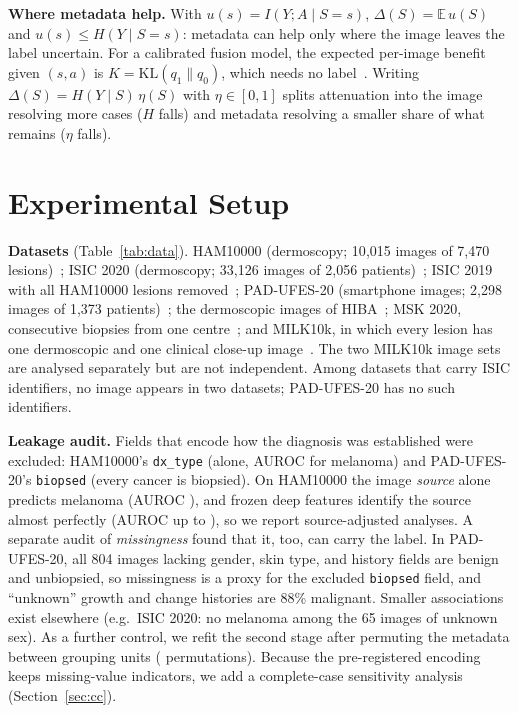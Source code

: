 \documentclass[conference]{IEEEtran}
\begin{document}
\textbf{Where metadata help.} With $u(s)=I(Y;A\mid S=s)$, $\Delta(S)=\mathbb{E}\,u(S)$ and $u(s)\le H(Y\mid S=s)$: metadata can help only where the image leaves the label uncertain. For a calibrated fusion model, the expected per-image benefit given $(s,a)$ is $K=\mathrm{KL}(q_1\|q_0)$, which needs no label~\cite{gadgil2024cmi}. Writing $\Delta(S)=H(Y\mid S)\,\eta(S)$ with $\eta\in[0,1]$ splits attenuation into the image resolving more cases ($H$ falls) and metadata resolving a smaller share of what remains ($\eta$ falls).

\section{Experimental Setup}\label{sec:setup}
\textbf{Datasets} (Table~\ref{tab:data}). HAM10000 (dermoscopy; 10{,}015 images of 7{,}470 lesions)~\cite{tschandl2018ham}; ISIC 2020 (dermoscopy; 33{,}126 images of 2{,}056 patients)~\cite{rotemberg2021isic}; ISIC 2019 with all HAM10000 lesions removed~\cite{combalia2019bcn}; PAD-UFES-20 (smartphone images; 2{,}298 images of 1{,}373 patients)~\cite{pacheco2020pad}; the dermoscopic images of HIBA~\cite{riccilara2023hiba}; MSK 2020, consecutive biopsies from one centre~\cite{msk2020collection}; and MILK10k, in which every lesion has one dermoscopic and one clinical close-up image~\cite{tschandl2026milk}. The two MILK10k image sets are analysed separately but are not independent. Among datasets that carry ISIC identifiers, no image appears in two datasets; PAD-UFES-20 has no such identifiers.

\textbf{Leakage audit.} Fields that encode how the diagnosis was established were excluded: HAM10000's \texttt{dx\_type} (alone, AUROC \HAMdxtypeAUC{} for melanoma) and PAD-UFES-20's \texttt{biopsed} (every cancer is biopsied). On HAM10000 the image \emph{source} alone predicts melanoma (AUROC \HAMsourceAUC{}), and frozen deep features identify the source almost perfectly (AUROC up to \HAMsourceRecov{}), so we report source-adjusted analyses. A separate audit of \emph{missingness} found that it, too, can carry the label. In PAD-UFES-20, all 804 images lacking gender, skin type, and history fields are benign and unbiopsied, so missingness is a proxy for the excluded \texttt{biopsed} field, and ``unknown'' growth and change histories are 88\% malignant. Smaller associations exist elsewhere (e.g.\ ISIC 2020: no melanoma among the 65 images of unknown sex). As a further control, we refit the second stage after permuting the metadata between grouping units (\PERMR{} permutations). Because the pre-registered encoding keeps missing-value indicators, we add a complete-case sensitivity analysis (Section~\ref{sec:cc}).
\end{document}
